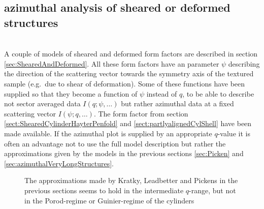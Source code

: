\newpage
\subsection{azimuthal analysis of sheared or deformed structures} ~\\
A couple of models of sheared and deformed form factors are described in section \ref{sec:ShearedAndDeformed}. All these form factors have an parameter $\psi$ describing the direction of the scattering vector towards the symmetry axis of the textured sample (e.g.\ due to shear of deformation). Some of these functions have been supplied so that they become a function of $\psi$ instead of $q$, to be able to describe not sector averaged data $I(q;\psi,\ldots)$ but rather azimuthal data at a fixed scattering vector $I(\psi;q,\ldots)$. The form factor from section \ref{sect:ShearedCylinderHayterPenfold} and \ref{sect:partlyalignedCylShell} have been made available. If the azimuthal plot is supplied by an appropriate $q$-value it is often an advantage not to use the full model description but rather the approximations given by the models in the previous sections \ref{sec:Picken} and \ref{sec:azimuthalVeryLongStructures}.

\begin{figure}[htb]
\captionsetup[subfigure]{position=b}
\centering
{}
\hfill
{}
\caption{The approximations made by Kratky, Leadbetter and Pickens in the previous sections seems to hold in the intermediate $q$-range, but not in the Porod-regime or Guinier-regime of the cylinders}
\label{fig:comparisionOfAzimuthalIntModels}
\end{figure}

